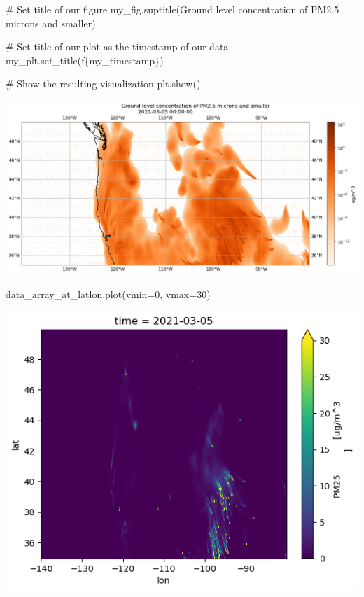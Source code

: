\documentclass[
  letterpaper,
  DIV=11,
  numbers=noendperiod]{scrreprt}
\newenvironment{Shaded}{\begin{snugshade}}{\end{snugshade}}
\newcommand{\CommentTok}[1]{\textcolor[rgb]{0.37,0.37,0.37}{#1}}
\newcommand{\DecValTok}[1]{\textcolor[rgb]{0.68,0.00,0.00}{#1}}
\newcommand{\NormalTok}[1]{\textcolor[rgb]{0.00,0.23,0.31}{#1}}
\newcommand{\OperatorTok}[1]{\textcolor[rgb]{0.37,0.37,0.37}{#1}}
\newcommand{\SpecialCharTok}[1]{\textcolor[rgb]{0.37,0.37,0.37}{#1}}
\newcommand{\SpecialStringTok}[1]{\textcolor[rgb]{0.13,0.47,0.30}{#1}}
\newcommand{\StringTok}[1]{\textcolor[rgb]{0.13,0.47,0.30}{#1}}
\begin{document}
\begin{Shaded}
\begin{Highlighting}[]
\CommentTok{\# Set title of our figure}
\NormalTok{my\_fig.suptitle(}\StringTok{\textquotesingle{}Ground level concentration of PM2.5 microns and smaller\textquotesingle{}}\NormalTok{)}

\CommentTok{\# Set title of our plot as the timestamp of our data}
\NormalTok{my\_plt.set\_title(}\SpecialStringTok{f\textquotesingle{}}\SpecialCharTok{\{}\NormalTok{my\_timestamp}\SpecialCharTok{\}}\SpecialStringTok{\textquotesingle{}}\NormalTok{)}

\CommentTok{\# Show the resulting visualization}
\NormalTok{plt.show()}
\end{Highlighting}
\end{Shaded}

\includegraphics{demo_files/figure-latex/data_notebooks-demo-demo-cell-16-output-1.png}

\begin{Shaded}
\begin{Highlighting}[]
\NormalTok{data\_array\_at\_latlon.plot(vmin}\OperatorTok{=}\DecValTok{0}\NormalTok{, vmax}\OperatorTok{=}\DecValTok{30}\NormalTok{)}
\end{Highlighting}
\end{Shaded}

\includegraphics{demo_files/figure-latex/data_notebooks-demo-demo-cell-17-output-1.png}
\end{document}
